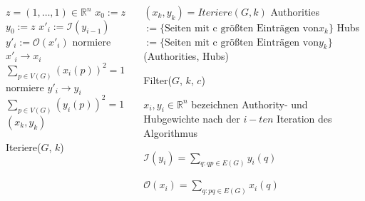 \documentclass[hyperref={pdfpagelabels=false}]{beamer}
\begin{document}
\begin{frame}


\begin{minipage}[0.2\textheight]{\textwidth}
	\begin{columns}[T]
		\begin{column}{0.5\textwidth}

			\begin{algorithm}[H]
				\begin{algorithmic}[1]
				\fontsize{11pt}{7.2}\selectfont
				\STATE $z = (1,\dots,1)\in{\mathbb{R}^n}$
				\STATE $x_0 := z$
				\STATE $y_0 := z$
					\STATE $x'_i:=\mathcal{I}(y_{i-1})$
					\STATE $y'_i:=\mathcal{O}(x'_{i})$
					\STATE normiere $x'_i \rightarrow x_i$\\
							$\sum_{p\in V(G)} (x_i(p))^2 = 1$
					\STATE normiere $y'_i \rightarrow y_i$\\
							$\sum_{p\in V(G)} (y_i(p))^2 = 1$
				\ENDFOR
				\RETURN $(x_k,y_k)$
				\end{algorithmic}
				\caption{Iteriere($G$, $k$)\cite{Kleinberg}}
			\end{algorithm}
		\end{column}
		
	\begin{column}{0.55\textwidth}
		\begin{algorithm}[H]
			\begin{algorithmic}[1]
			\fontsize{10pt}{7.2}\selectfont
			\STATE $(x_k,y_k) = Iteriere(G,k)$
			\STATE Authorities $:= \{\text{Seiten mit c größten Einträgen von} x_k\}$ 
			\STATE Hubs $:= \{\text{Seiten mit c größten Einträgen von} y_k\}$ 
			\RETURN (Authorities, Hubs)
			\end{algorithmic}
		\caption{Filter($G$, $k$, $c$)\cite{Kleinberg}}
		\end{algorithm}
		
		
		$x_i, y_i\in{\mathbb{R}^n}$ bezeichnen Authority- und Hubgewichte nach der $i-ten$ Iteration des Algorithmus
		
		\centering
		\vspace{5pt}
		$\mathcal{I}(y_i) = \sum_{q:qp\in E(G)}y_i(q)$
		
		\vspace{3pt}
		$\mathcal{O}(x_i) = \sum_{q:pq\in E(G)}x_i(q)$
		
		

	\end{column}
	\end{columns}
\end{minipage}
\end{frame}
\end{document}
